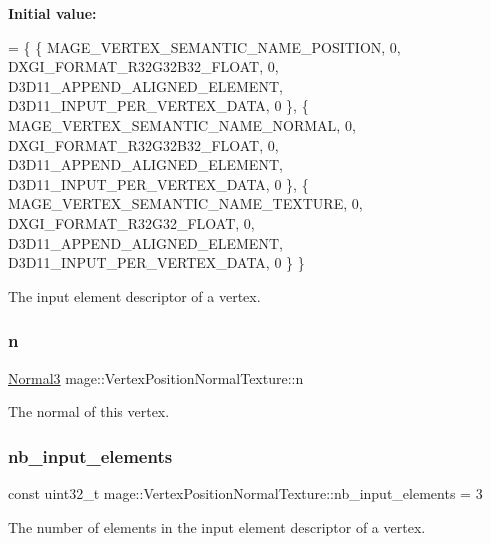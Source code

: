 {\bfseries Initial value\+:}
\begin{DoxyCode}
= \{
        \{ MAGE\_VERTEX\_SEMANTIC\_NAME\_POSITION, 0, DXGI\_FORMAT\_R32G32B32\_FLOAT,    0, 
      D3D11\_APPEND\_ALIGNED\_ELEMENT, D3D11\_INPUT\_PER\_VERTEX\_DATA, 0 \},
        \{ MAGE\_VERTEX\_SEMANTIC\_NAME\_NORMAL,   0, DXGI\_FORMAT\_R32G32B32\_FLOAT,    0, 
      D3D11\_APPEND\_ALIGNED\_ELEMENT, D3D11\_INPUT\_PER\_VERTEX\_DATA, 0 \},
        \{ MAGE\_VERTEX\_SEMANTIC\_NAME\_TEXTURE,  0, DXGI\_FORMAT\_R32G32\_FLOAT,       0, 
      D3D11\_APPEND\_ALIGNED\_ELEMENT, D3D11\_INPUT\_PER\_VERTEX\_DATA, 0 \}
    \}
\end{DoxyCode}
The input element descriptor of a vertex. \hypertarget{structmage_1_1_vertex_position_normal_texture_a442eb1609ab596e3e33c26f7be32695a}{}\label{structmage_1_1_vertex_position_normal_texture_a442eb1609ab596e3e33c26f7be32695a} 
\subsubsection{\texorpdfstring{n}{n}}
{\footnotesize\ttfamily \hyperlink{structmage_1_1_normal3}{Normal3} mage\+::\+Vertex\+Position\+Normal\+Texture\+::n}

The normal of this vertex. \hypertarget{structmage_1_1_vertex_position_normal_texture_ae4e7cf708af3f123450ec65a68e21584}{}\label{structmage_1_1_vertex_position_normal_texture_ae4e7cf708af3f123450ec65a68e21584} 
\subsubsection{\texorpdfstring{nb\+\_\+input\+\_\+elements}{nb\_input\_elements}}
{\footnotesize\ttfamily const uint32\+\_\+t mage\+::\+Vertex\+Position\+Normal\+Texture\+::nb\+\_\+input\+\_\+elements = 3\hspace{0.3cm}{\ttfamily [static]}}

The number of elements in the input element descriptor of a vertex. \hypertarget{structmage_1_1_vertex_position_normal_texture_a9000b80274027dd7b7d258f45523ca65}{}\label{structmage_1_1_vertex_position_normal_texture_a9000b80274027dd7b7d258f45523ca65} 
